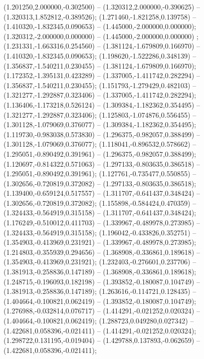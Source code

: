  (1.201250,2.000000,-0.302500) -- (1.320312,2.000000,-0.390625) -- (1.320313,1.852812,-0.389526);
 (1.271460,-1.821258,0.139758) -- (1.410320,-1.832345,0.090653) -- (1.445000,-2.000000,0.000000);
 (1.320312,-2.000000,0.000000) -- (1.445000,-2.000000,0.000000) ;
 (1.231331,-1.663316,0.254560) -- (1.381124,-1.679809,0.166970) -- (1.410320,-1.832345,0.090653);
 (1.198620,-1.522286,0.348139) -- (1.356837,-1.540211,0.230455) -- (1.381124,-1.679809,0.166970);
 (1.172352,-1.395131,0.423289) -- (1.337005,-1.411742,0.282294) -- (1.356837,-1.540211,0.230455);
 (1.151793,-1.279429,0.482103) -- (1.321277,-1.292887,0.323406) -- (1.337005,-1.411742,0.282294);
 (1.136406,-1.173218,0.526124) -- (1.309384,-1.182362,0.354495) -- (1.321277,-1.292887,0.323406);
 (1.125803,-1.074876,0.556455) -- (1.301128,-1.079069,0.376077) -- (1.309384,-1.182362,0.354495);
 (1.119730,-0.983038,0.573830) -- (1.296375,-0.982057,0.388499) -- (1.301128,-1.079069,0.376077);
 (1.118041,-0.896532,0.578662) -- (1.295051,-0.890492,0.391961) -- (1.296375,-0.982057,0.388499);
 (1.120697,-0.814322,0.571063) -- (1.297133,-0.803635,0.386518) -- (1.295051,-0.890492,0.391961);
 (1.127761,-0.735477,0.550855) -- (1.302656,-0.720819,0.372082) -- (1.297133,-0.803635,0.386518);
 (1.139400,-0.659124,0.517557) -- (1.311707,-0.641437,0.348424) -- (1.302656,-0.720819,0.372082);
 (1.155898,-0.584424,0.470359) -- (1.324433,-0.564919,0.315158) -- (1.311707,-0.641437,0.348424);
 (1.176249,-0.510012,0.411703) -- (1.339967,-0.489978,0.273985) -- (1.324433,-0.564919,0.315158);
 (1.196042,-0.433826,0.352751) -- (1.354903,-0.413969,0.231921) -- (1.339967,-0.489978,0.273985);
 (1.214803,-0.355939,0.294656) -- (1.368908,-0.336861,0.189618) -- (1.354903,-0.413969,0.231921);
 (1.232403,-0.276601,0.237706) -- (1.381913,-0.258836,0.147189) -- (1.368908,-0.336861,0.189618);
 (1.248715,-0.196093,0.182198) -- (1.393852,-0.180087,0.104749) -- (1.381913,-0.258836,0.147189);
 (1.263616,-0.114721,0.128435) -- (1.404664,-0.100821,0.062419) -- (1.393852,-0.180087,0.104749);
 (1.276988,-0.032814,0.076717) -- (1.414291,-0.021252,0.020324) -- (1.404664,-0.100821,0.062419);
 (1.288723,0.049280,0.027342) -- (1.422681,0.058396,-0.021411) -- (1.414291,-0.021252,0.020324);
 (1.298722,0.131195,-0.019404) -- (1.429788,0.137893,-0.062659) -- (1.422681,0.058396,-0.021411);
